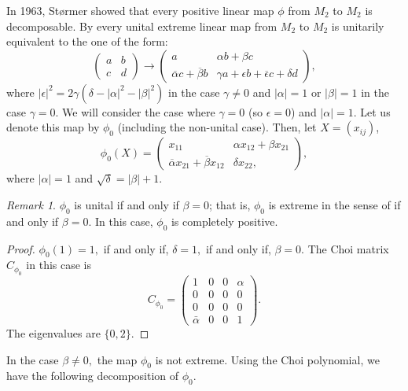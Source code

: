 \documentclass[12pt,a4paper]{amsart}
\theoremstyle{plain}
\theoremstyle{remark}
\newtheorem{remark}{Remark}
\theoremstyle{definition}
\begin{document}
In 1963, St\o rmer \cite{Stormer63} showed that every positive linear map $\phi$ from $M_2$ to $M_2$ is decomposable. By \cite[Theorem 8.2]{Stormer63} every unital extreme linear map
from $M_2$ to $M_2$ is unitarily equivalent to the one of the form:
$$
\left( \begin{array}{ll}
	a & b  \\
	c  & d	  
\end{array}  \right)  \rightarrow 
\left( \begin{array}{ll}
	a & \alpha b + \beta c \\
	\overline{\alpha}c + \overline{\beta}b  & \gamma a+ \epsilon b+ \overline{\epsilon} c+\delta d	  
\end{array} \right),
$$
where $|\epsilon|^2 = 2\gamma (\delta - |\alpha|^2-|\beta|^2)$ in the case $\gamma \ne 0$ and $|\alpha|=1$ or $|\beta| =1$ in the case $\gamma =0.$
We will consider the case where $\gamma = 0$ (so $\epsilon = 0$) and $|\alpha| = 1$. Let us denote this map by $\phi_0$ (including the non-unital case). 
Then, let $X=(x_{ij})$, 
$$
\phi_0(X) = 
\left( \begin{array}{ll}
	x_{11} & \alpha x_{12} + \beta x_{21} \\
	\overline{\alpha}x_{21} + \overline{\beta}x_{12}  & \delta x_{22},	  
\end{array} \right), $$
where $|\alpha| =1$ and $\sqrt{\delta} = {|\beta|+1}.$
\begin{remark}
$\phi_0$ is unital if and only if $\beta = 0$; that is, $\phi_0$ is extreme in the sense of \cite{Stormer63} if and only if $\beta = 0$. In this case, $\phi_0$ is completely positive.
\end{remark}
\begin{proof}
$\phi_0 (1) =1,$ if and only if, $\delta =1,$ if and only if, $\beta =0.$ 
The Choi matrix $C_{\phi_0}$ in this case is
$$C_{\phi_0} = \begin{pmatrix} 1 & 0 & 0 & \alpha \\ 0 & 0 & 0 & 0 \\ 0 & 0 & 0 & 0 \\ \bar{\alpha} & 0 & 0 & 1 \end{pmatrix}.$$
The eigenvalues are $\{0, 2\}.$
\end{proof}
In the case $\beta \ne 0,$ the map $\phi_0$ is not extreme. Using the Choi polynomial, we have the following decomposition of $\phi_0.$
\end{document}
